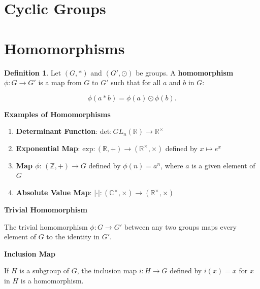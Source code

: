\documentclass[
]{book}
\providecommand{\tightlist}{%
  \setlength{\itemsep}{0pt}\setlength{\parskip}{0pt}}
\theoremstyle{definition}
\newtheorem{definition}{Definition}[chapter]
\theoremstyle{definition}
\theoremstyle{definition}
\theoremstyle{definition}
\theoremstyle{remark}
\begin{document}
\hypertarget{cyclic-groups}{%
\section{Cyclic Groups}\label{cyclic-groups}}

\hypertarget{homomorphisms}{%
\section{Homomorphisms}\label{homomorphisms}}

\begin{definition}
\protect\hypertarget{def:unnamed-chunk-13}{}\label{def:unnamed-chunk-13}Let \((G, *)\) and \((G', \odot)\) be groups. A \textbf{homomorphism} \(\phi: G \rightarrow G'\) is a map from \(G\) to \(G'\) such that for all \(a\) and \(b\) in \(G\):

\begin{equation}
    \phi(a * b) = \phi(a) \odot \phi(b).
\end{equation}
\end{definition}

\textbf{Examples of Homomorphisms}

\begin{enumerate}
\def\labelenumi{\arabic{enumi}.}
\tightlist
\item
  \textbf{Determinant Function}: \(\text{det}: GL_n(\mathbb{R}) \to \mathbb{R}^\times\)
\item
  \textbf{Exponential Map}: \(\text{exp}: (\mathbb{R}, +) \to (\mathbb{R}^\times, \times)\) defined by \(x \mapsto e^x\)
\item
  \textbf{Map \(\phi\)}: \((\mathbb{Z}, +) \to G\) defined by \(\phi(n) = a^n\), where \(a\) is a given element of \(G\)
\item
  \textbf{Absolute Value Map}: \(|\cdot| : (\mathbb{C}^\times, \times) \to (\mathbb{R}^\times, \times)\)
\end{enumerate}

\textbf{Trivial Homomorphism}

The trivial homomorphism \(\phi: G \rightarrow G'\) between any two groups maps every element of \(G\) to the identity in \(G'\).

\textbf{Inclusion Map}

If \(H\) is a subgroup of \(G\), the inclusion map \(i: H \rightarrow G\) defined by \(i(x) = x\) for \(x\) in \(H\) is a homomorphism.
\end{document}
